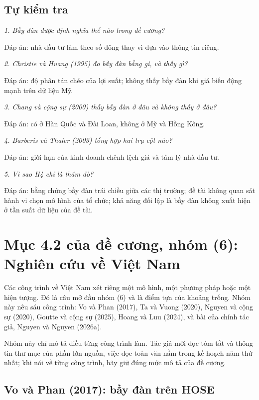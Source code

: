 \section{Tự kiểm tra}

{\itshape 1. Bầy đàn được định nghĩa thế nào trong đề cương?\par}

Đáp án: nhà đầu tư làm theo số đông thay vì dựa vào thông tin riêng.

{\itshape 2. Christie và Huang (1995) đo bầy đàn bằng gì, và thấy gì?\par}

Đáp án: độ phân tán chéo của lợi suất; không thấy bầy đàn khi giá biến động mạnh trên dữ liệu Mỹ.

{\itshape 3. Chang và cộng sự (2000) thấy bầy đàn ở đâu và không thấy ở đâu?\par}

Đáp án: có ở Hàn Quốc và Đài Loan, không ở Mỹ và Hồng Kông.

{\itshape 4. Barberis và Thaler (2003) tổng hợp hai trụ cột nào?\par}

Đáp án: giới hạn của kinh doanh chênh lệch giá và tâm lý nhà đầu tư.

{\itshape 5. Vì sao H4 chỉ là thăm dò?\par}

Đáp án: bằng chứng bầy đàn trái chiều giữa các thị trường; đề tài không quan sát hành vi chọn mô hình của tổ chức; khả năng đối lập là bầy đàn không xuất hiện ở tần suất dữ liệu của đề tài.

\chapter{Mục 4.2 của đề cương, nhóm (6): Nghiên cứu về Việt Nam}

Các công trình về Việt Nam xét riêng một mô hình, một phương pháp hoặc một hiện tượng. Đó là câu mở đầu nhóm (6) và là điểm tựa của khoảng trống. Nhóm này nêu sáu công trình: Vo và Phan (2017), Ta và Vuong (2020), Nguyen và cộng sự (2020), Goutte và cộng sự (2025), Hoang và Luu (2024), và bài của chính tác giả, Nguyen và Nguyen (2026a).

Nhóm này chỉ mô tả điều từng công trình làm. Tác giả mới đọc tóm tắt và thông tin thư mục của phần lớn nguồn, việc đọc toàn văn nằm trong kế hoạch năm thứ nhất; khi nói về từng công trình, hãy giữ đúng mức mô tả của đề cương.

\section{Vo và Phan (2017): bầy đàn trên HOSE}

